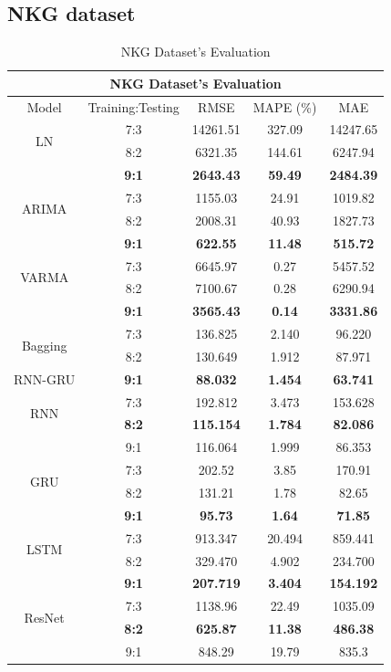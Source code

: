 \documentclass{ieeeojies}
\begin{document}
\subsection{NKG dataset} 
\begin{table}[H]
    \centering
    \begin{tabular}{|c|c|c|c|c|}
         \hline
         \multicolumn{5}{|c|}{\textbf{NKG Dataset's Evaluation}}\\
         \hline
         \centering Model & Training:Testing & RMSE & MAPE (\%) & MAE\\
         \hline
         \multirow{2}{*}{LN} & 7:3 & 14261.51 & 327.09 & 14247.65 \\ & 8:2 & 6321.35 & 144.61 & 6247.94 \\ & \textbf{9:1} & \textbf{2643.43} & \textbf{59.49} & \textbf{2484.39}\\
         \hline
         \multirow{2}{*}{ARIMA} & 7:3&1155.03&24.91&1019.82\\ & 8:2&2008.31&40.93&1827.73 \\ & \textbf{9:1} & \textbf{622.55} & \textbf{11.48} & \textbf{515.72}\\
         \hline
         \multirow{2}{*}{VARMA} & 7:3	& 6645.97 &  0.27 & 5457.52 \\ & 8:2 & 7100.67 & 0.28 & 6290.94 \\ & \textbf{9:1} & \textbf{3565.43}  & \textbf{0.14} & \textbf{3331.86}\\
         \hline
         \multirow{2}{*}{Bagging} & 7:3 &  136.825 &  2.140 & 96.220 \\ & 8:2 &  130.649 & 1.912 & 87.971 \\{RNN-GRU} & \textbf{9:1} & \textbf{88.032}  & \textbf{1.454} & \textbf{63.741}\\
         \hline
         \multirow{2}{*}{RNN} & 7:3	& 192.812 & 3.473 & 153.628 \\ & \textbf{8:2} & \textbf{115.154} & \textbf{1.784} & \textbf{82.086} \\ & 9:1 & 116.064 & 1.999 & 86.353\\
         \hline
         \multirow{2}{*}{GRU} & 7:3 & 202.52 & 3.85 & 170.91 \\  & 8:2 &131.21	&1.78&82.65 \\ & \textbf{9:1} & \textbf{95.73} & \textbf{1.64} & \textbf{71.85} \\
         \hline
         \multirow{2}{*}{LSTM} & 7:3 & 913.347 & 20.494 & 859.441 \\ & 8:2 & 329.470 &4.902 & 234.700 \\ & \textbf{9:1} &  	\textbf{207.719} &	\textbf{3.404} & 	\textbf{154.192} \\
         \hline
         \multirow{2}{*}{ResNet} & 7:3 & 1138.96 &  22.49 &  1035.09 \\ & \textbf{8:2} & \textbf{625.87} & \textbf{11.38} & \textbf{486.38}\\ & 9:1 & 848.29 &  19.79 &  835.3 \\ 
         \hline
    \end{tabular}
    \caption{NKG Dataset's Evaluation}
    \label{mbbresult}
\end{table}
\end{document}

